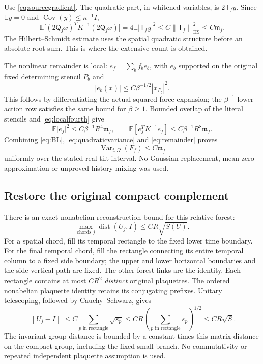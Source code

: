 \documentclass[11pt,letterpaper]{article}
\numberwithin{equation}{section}
\theoremstyle{definition}\newtheorem{definition}[theorem]{Definition}
\theoremstyle{remark}\newtheorem{remark}[theorem]{Remark}
\newcommand{\E}{\mathbb E}\newcommand{\Var}{\operatorname{Var}}
\newcommand{\Cov}{\operatorname{Cov}}\newcommand{\Tr}{\operatorname{Tr}}
\newcommand{\HS}{\mathrm{HS}}\newcommand{\supp}{\operatorname{supp}}
\newcommand{\mf}{\mathfrak m_f}\newcommand{\eps}{\varepsilon}
\newcommand{\norm}[1]{\left\lVert #1\right\rVert}
\begin{document}
Use \eqref{eq:sourcegradient}. The quadratic part, in whitened variables, is $2\mathsf T_fy$. Since $\E y=0$ and $\Cov(y)\le\kappa^{-1}I$,
\begin{equation}
 \E\bigl[(2\mathsf Q_fx)^TK^{-1}(2\mathsf Q_fx)\bigr]
 =4\E|\mathsf T_fy|^2\le C\norm{\mathsf T_f}_{\HS}^2
 \le C\mf.
 \label{eq:quadraticvariance}
\end{equation}
The Hilbert--Schmidt estimate uses the spatial quadratic structure before an absolute root sum. This is where the extensive count is obtained.

The nonlinear remainder is local: $e_f=\sum_bf_be_b$, with $e_b$ supported on the original fixed determining stencil $P_b$ and
\[
 |e_b(x)|\le C\beta^{-1/2}|x_{P_b}|^2.
\]
This follows by differentiating the actual squared-force expansion; the $\beta^{-1}$ lower action row satisfies the same bound for $\beta\ge1$. Bounded overlap of the literal stencils and \eqref{eq:localfourth} give
\begin{equation}
 \E|e_f|^2\le C\beta^{-1}R^4\mf,
 \qquad
 \E[e_f^TK^{-1}e_f]\le C\beta^{-1}R^8\mf.
 \label{eq:remainder}
\end{equation}
Combining \eqref{eq:BL}, \eqref{eq:quadraticvariance} and \eqref{eq:remainder} proves
\begin{equation}
 \Var_{t,\Omega}(F_f)\le C\mf
 \label{eq:chartvariance}
\end{equation}
uniformly over the stated real tilt interval. No Gaussian replacement, mean-zero approximation or unproved history mixing was used.

\subsection{Restore the original compact complement}

There is an exact nonabelian reconstruction bound for this relative forest:
\begin{equation}
 \max_{\text{chords }j}\operatorname{dist}(U_j,I)
 \le CR\sqrt{S(U)}.
 \label{eq:reconstruction}
\end{equation}
For a spatial chord, fill its temporal rectangle to the fixed lower time boundary. For the final temporal chord, fill the rectangle connecting its entire temporal column to a fixed side boundary; the upper and lower horizontal boundaries and the side vertical path are fixed. The other forest links are the identity. Each rectangle contains at most $CR^2$ \emph{distinct} original plaquettes. The ordered nonabelian plaquette identity retains its conjugating prefixes. Unitary telescoping, followed by Cauchy--Schwarz, gives
\[
 \norm{U_j-I}\le C\sum_{p\text{ in rectangle}}\sqrt{s_p}
 \le CR\left(\sum_{p\text{ in rectangle}}s_p\right)^{1/2}
 \le CR\sqrt S.
\]
The invariant group distance is bounded by a constant times this matrix distance on the compact group, including the fixed small branch. No commutativity or repeated independent plaquette assumption is used.
\end{document}
